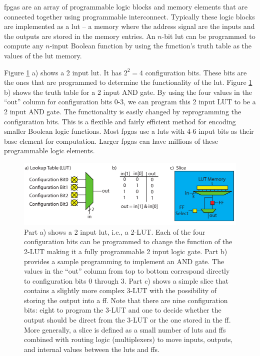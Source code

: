 \glspl{fpga} are an array of programmable logic blocks and memory elements that are connected together using programmable interconnect. Typically these logic blocks are implemented as a \gls{lut} -- a memory where the address signal are the inputs and the outputs are stored in the memory entries. An $n$-bit \gls{lut} can be programmed to compute any $n$-input Boolean function by using the function's truth table as the values of the \gls{lut} memory. 

Figure \ref{fig:lut} a) shows a 2 input \gls{lut}. It has $2^2 = 4$ configuration bits. These bits are the ones that are programmed to determine the functionality of the \gls{lut}.  Figure \ref{fig:lut} b) shows the truth table for a 2 input AND gate. By using the four values in the ``out'' column for configuration bits 0-3, we can program this 2 input LUT to be a 2 input AND gate. The functionality is easily changed by reprogramming the configuration bits. This is a flexible and fairly efficient method for encoding smaller Boolean logic functions. Most \glspl{fpga} use a \glspl{lut} with 4-6 input bits as their base element for computation. Larger \glspl{fpga} can have millions of these programmable logic elements.

\begin{figure}
\centering
\includegraphics[width= \textwidth]{images/lut}
\caption{Part a) shows a 2 input \gls{lut}, i.e., a 2-LUT. Each of the four configuration bits can be programmed to change the function of the 2-LUT making it a fully programmable 2 input logic gate. Part b) provides a sample programming to implement an AND gate.  The values in the ``out'' column from top to bottom correspond directly to configuration bits 0 through 3. Part c) shows a simple \gls{slice} that contains a slightly more complex 3-LUT with the possibility of storing the output into a \gls{ff}. Note that there are nine configuration bits: eight to program the 3-LUT and one to decide whether the output should be direct from the 3-LUT or the one stored in the \gls{ff}. More generally, a \gls{slice} is defined as a small number of \glspl{lut} and \glspl{ff} combined with routing logic (multiplexers) to move inputs, outputs, and internal values between the \glspl{lut} and \glspl{ff}.}
\label{fig:lut}
\end{figure}


